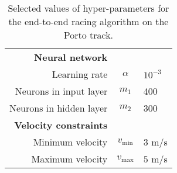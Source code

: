 \begin{table}[htb!]
\begin{tabularx}{0.7\textwidth}{RCL}
    \textbf{Neural network}                 &                           & \\
    Learning rate                           & $\alpha$                  & $10^{-3}$ \\
    Neurons in input layer                  & $m_1$                     & 400 \\
    Neurons in hidden layer                 & $m_2$                     & 300 \\
    \textbf{Velocity constraints}           &                           & \\
    Minimum velocity                        & $v_{\text{min}}$          & $3$ m/s \\
    Maximum velocity                        & $v_{\text{max}}$          & $5$ m/s \\
    \hline
\end{tabularx}
\caption[Selected values of hyper-parameters for the end-to-end algorithm]{Selected values of hyper-parameters for the end-to-end racing algorithm on the Porto track.}
\label{tab:inital_values}
\end{table}
